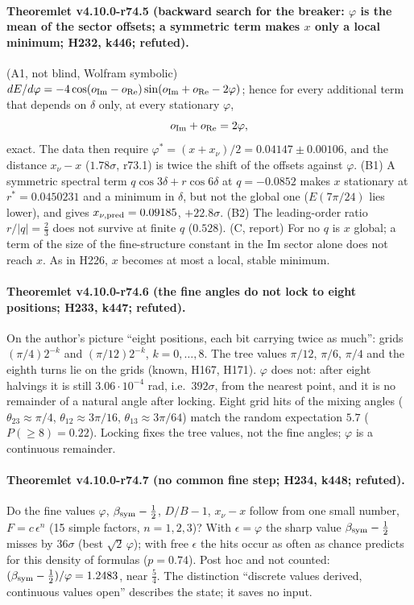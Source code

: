 \paragraph{Theoremlet v4.10.0-r74.5 (backward search for the breaker: \(\varphi\) is the mean of the sector offsets; a symmetric term makes \(x\) only a local minimum; H232, k446; refuted).}
(A1, not blind, Wolfram symbolic) \(dE/d\varphi=-4\cos(o_{\rm Im}-o_{\rm Re})\sin(o_{\rm Im}+o_{\rm Re}-2\varphi)\); hence for every additional term that
depends on \(\delta\) only, at every stationary \(\varphi\),
\[
o_{\rm Im}+o_{\rm Re}=2\varphi ,
\]
exact.  The data then require \(\varphi^*=(x+x_\nu)/2=0.04147\pm0.00106\), and the distance \(x_\nu-x\) (\(1.78\sigma\), r73.1) is twice the shift of
the offsets against \(\varphi\).  (B1) A symmetric spectral term \(q\cos3\delta+r\cos6\delta\) at \(q=-0.0852\) makes \(x\) stationary at
\(r^*=0.0450231\) and a minimum in \(\delta\), but not the global one (\(E(7\pi/24)\) lies lower), and gives \(x_{\nu,\rm pred}=0.09185\), \(+22.8\sigma\).
(B2) The leading-order ratio \(r/|q|=\tfrac23\) does not survive at finite \(q\) (\(0.528\)).  (C, report) For no \(q\) is \(x\) global; a term of
the size of the fine-structure constant in the Im sector alone does not reach \(x\).  As in H226, \(x\) becomes at most a local, stable minimum.

\paragraph{Theoremlet v4.10.0-r74.6 (the fine angles do not lock to eight positions; H233, k447; refuted).}
On the author's picture ``eight positions, each bit carrying twice as much'': grids \((\pi/4)2^{-k}\) and \((\pi/12)2^{-k}\), \(k=0,\ldots,8\).
The tree values \(\pi/12\), \(\pi/6\), \(\pi/4\) and the eighth turns lie on the grids (known, H167, H171).  \(\varphi\) does not: after eight halvings
it is still \(3.06\cdot10^{-4}\) rad, i.e.\ \(392\sigma\), from the nearest point, and it is no remainder of a natural angle after locking.  Eight
grid hits of the mixing angles (\(\theta_{23}\approx\pi/4\), \(\theta_{12}\approx3\pi/16\), \(\theta_{13}\approx3\pi/64\)) match the random
expectation \(5.7\) (\(P(\ge8)=0.22\)).  Locking fixes the tree values, not the fine angles; \(\varphi\) is a continuous remainder.

\paragraph{Theoremlet v4.10.0-r74.7 (no common fine step; H234, k448; refuted).}
Do the fine values \(\varphi\), \(\beta_{\rm sym}-\tfrac12\), \(D/B-1\), \(x_\nu-x\) follow from one small number, \(F=c\,\epsilon^n\) (15 simple factors,
\(n=1,2,3\))?  With \(\epsilon=\varphi\) the sharp value \(\beta_{\rm sym}-\tfrac12\) misses by \(36\sigma\) (best \(\sqrt2\,\varphi\)); with free \(\epsilon\)
the hits occur as often as chance predicts for this density of formulas (\(p=0.74\)).  Post hoc and not counted: \((\beta_{\rm sym}-\tfrac12)/\varphi
=1.2483\), near \(\tfrac54\).  The distinction ``discrete values derived, continuous values open'' describes the state; it saves no input.

